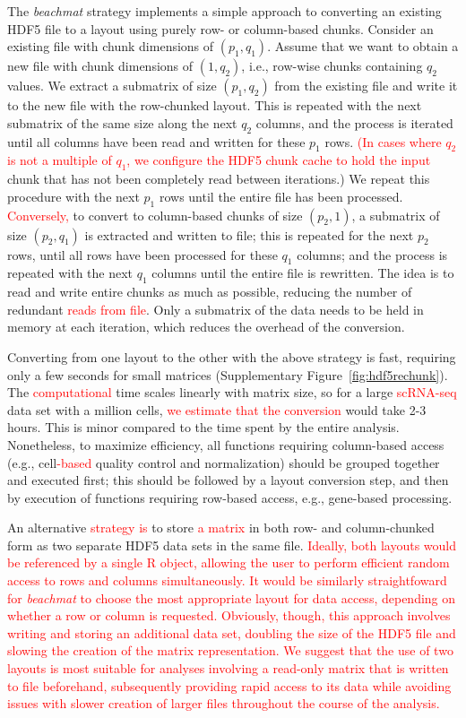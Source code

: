 \documentclass{article}
\newcommand{\beachmat}{\textit{beachmat}}
\newcommand{\revised}[1]{\textcolor{red}{#1}}
\begin{document}
The \beachmat{} strategy implements a simple approach to converting an existing HDF5 file to a layout using purely row- or column-based chunks.
Consider an existing file with chunk dimensions of $(p_1, q_1)$. 
Assume that we want to obtain a new file with chunk dimensions of $(1, q_2)$, i.e., row-wise chunks containing $q_2$ values.
We extract a submatrix of size $(p_1, q_2)$ from the existing file and write it to the new file with the row-chunked layout.
This is repeated with the next submatrix of the same size along the next $q_2$ columns, and the process is iterated until all columns have been read and written for these $p_1$ rows.
\revised{(In cases where $q_2$ is not a multiple of $q_1$, we configure the HDF5 chunk cache to hold the input} chunk that has not been completely read between iterations.)
We repeat this procedure with the next $p_1$ rows until the entire file has been processed.
\revised{Conversely,} to convert to column-based chunks of size $(p_2, 1)$, a submatrix of size $(p_2, q_1)$ is extracted and written to file; this is repeated for the next $p_2$ rows, until all rows have been processed for these $q_1$ columns; and the process is repeated with the next $q_1$ columns until the entire file is rewritten.
The idea is to read and write entire chunks as much as possible, reducing the number of redundant \revised{reads from file}.
Only a submatrix of the data needs to be held in memory at each iteration, which reduces the overhead of the conversion.

Converting from one layout to the other with the above strategy is fast, requiring only a few seconds for small matrices (Supplementary Figure~\ref{fig:hdf5rechunk}).
The \revised{computational} time scales linearly with matrix size, so for a large \revised{scRNA-seq} data set with a million cells, \revised{we estimate that the conversion} would take 2-3 hours.
This is minor compared to the time spent by the entire analysis.
Nonetheless, to maximize efficiency, all functions requiring column-based access (e.g., cell\revised{-based} quality control and normalization) should be grouped together and executed first; 
this should be followed by a layout conversion step, and then by execution of functions requiring row-based access, e.g., gene-based processing.

An alternative \revised{strategy is} to store \revised{a matrix} in both row- and column-chunked form as two separate HDF5 data sets in the same file.
\revised{Ideally, both layouts would be referenced by a single R object, allowing the user to perform efficient random access to rows and columns simultaneously.
It would be similarly straightfoward for \beachmat{} to choose the most appropriate layout for data access, depending on whether a row or column is requested.
Obviously, though, this approach involves writing and storing an additional data set, doubling the size of the HDF5 file and slowing the creation of the matrix representation.
We suggest that the use of two layouts is most suitable for analyses involving a read-only matrix that is written to file beforehand, subsequently providing rapid access to its data while avoiding issues with slower creation of larger files throughout the course of the analysis.}
\end{document}
